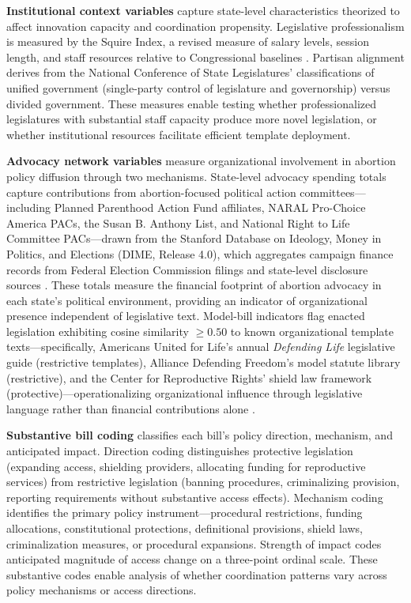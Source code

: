 \textbf{Institutional context variables} capture state-level characteristics theorized to affect innovation capacity and coordination propensity. Legislative professionalism is measured by the Squire Index, a revised measure of salary levels, session length, and staff resources relative to Congressional baselines \parencite{squireMeasuringStateLegislative2007, squireSquireIndexUpdate2024}.
Partisan alignment derives from the National Conference of State Legislatures' classifications of unified government (single-party control of legislature and governorship) versus divided government. These measures enable testing whether professionalized legislatures with substantial staff capacity produce more novel legislation, or whether institutional resources facilitate efficient template deployment.

\textbf{Advocacy network variables} measure organizational involvement in abortion policy diffusion through two mechanisms. State-level advocacy spending totals capture contributions from abortion-focused political action committees---including Planned Parenthood Action Fund affiliates, NARAL Pro-Choice America PACs, the Susan B. Anthony List, and National Right to Life Committee PACs---drawn from the Stanford Database on Ideology, Money in Politics, and Elections (DIME, Release 4.0), which aggregates campaign finance records from Federal Election Commission filings and state-level disclosure sources \parencite{bonica2024}. These totals measure the financial footprint of abortion advocacy in each state's political environment, providing an indicator of organizational presence independent of legislative text. Model-bill indicators flag enacted legislation exhibiting cosine similarity $\geq 0.50$ to known organizational template texts---specifically, Americans United for Life's annual \textit{Defending Life} legislative guide (restrictive templates), Alliance Defending Freedom's model statute library (restrictive), and the Center for Reproductive Rights' shield law framework (protective)---operationalizing organizational influence through legislative language rather than financial contributions alone \parencite{hertel-fernandezStateCapture2019,jansaCopyPasteLawmaking2019}.

\textbf{Substantive bill coding} classifies each bill's policy direction, mechanism, and anticipated impact. Direction coding distinguishes protective legislation (expanding access, shielding providers, allocating funding for reproductive services) from restrictive legislation (banning procedures, criminalizing provision, reporting requirements without substantive access effects). Mechanism coding identifies the primary policy instrument---procedural restrictions, funding allocations, constitutional protections, definitional provisions, shield laws, criminalization measures, or procedural expansions. Strength of impact codes anticipated magnitude of access change on a three-point ordinal scale. These substantive codes enable analysis of whether coordination patterns vary across policy mechanisms or access directions.

